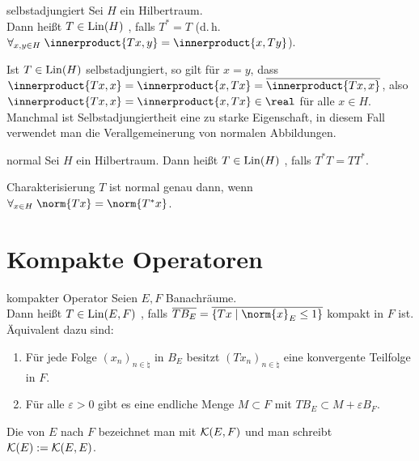 \linie

\begin{Def}{selbstadjungiert}
    Sei $H$ ein Hilbertraum.\\
    Dann heißt $T \in \operatorname{Lin}(H)$ , falls $T^\ast = T$
    (d.\,h. $\forall_{x, y \in H}\; \innerproduct{Tx, y} = \innerproduct{x, Ty}$).
\end{Def}

\begin{Bem}
    Ist $T \in \operatorname{Lin}(H)$ selbstadjungiert, so gilt für $x = y$, dass
    $\innerproduct{Tx, x} = \innerproduct{x, Tx} = \overline{\innerproduct{Tx, x}}$,
    also $\innerproduct{Tx, x} = \innerproduct{x, Tx} \in \real$ für alle $x \in H$.
    Manchmal ist Selbstadjungiertheit eine zu starke Eigenschaft,
    in diesem Fall verwendet man die Verallgemeinerung von normalen Abbildungen.
\end{Bem}

\begin{Def}{normal}
    Sei $H$ ein Hilbertraum.
    Dann heißt $T \in \operatorname{Lin}(H)$ , falls $T^\ast T = TT^\ast$.
\end{Def}

\begin{Lemma}{Charakterisierung}
    $T$ ist normal genau dann, wenn
    $\forall_{x \in H}\; \norm{Tx} = \norm{T^\ast x}$.
\end{Lemma}

\pagebreak

\section{%
    Kompakte Operatoren%
}

\begin{Def}{kompakter Operator}
    Seien $E, F$ Banachräume.\\
    Dann heißt $T \in \operatorname{Lin}(E, F)$ , falls
    $\overline{T B_E} = \overline{\{Tx \;|\; \norm{x}_E \le 1\}}$ kompakt in $F$ ist.\\
    Äquivalent dazu sind:
    \begin{enumerate}
        \item
        Für jede Folge $(x_n)_{n \in \natural}$ in $B_E$ besitzt $(Tx_n)_{n \in \natural}$
        eine konvergente Teilfolge in $F$.

        \item
        Für alle $\varepsilon > 0$ gibt es eine endliche Menge $M \subset F$ mit
        $TB_E \subset M + \varepsilon B_F$.
    \end{enumerate}
    Die  von $E$ nach $F$ bezeichnet man mit
    $\mathcal{K}(E, F)$ und man schreibt $\mathcal{K}(E) := \mathcal{K}(E, E)$.
\end{Def}

